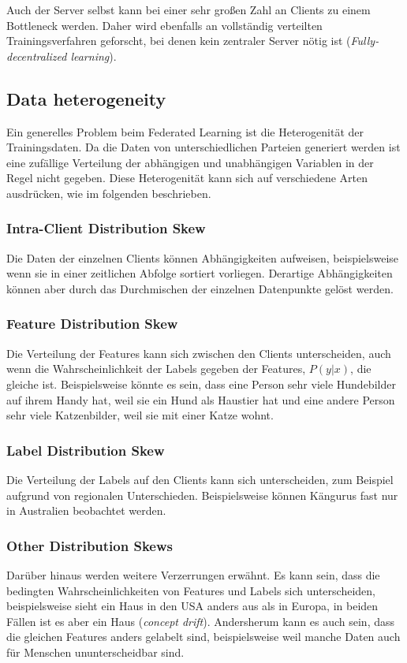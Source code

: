 Auch der Server selbst kann bei einer sehr großen Zahl an Clients zu einem Bottleneck werden.\cite[p.11]{kairouz:2021} Daher wird ebenfalls an vollständig verteilten Trainingsverfahren geforscht, bei denen kein zentraler Server nötig ist (\textit{Fully-decentralized learning}).

\subsection{Data heterogeneity}

Ein generelles Problem beim Federated Learning ist die Heterogenität der Trainingsdaten. Da die Daten von unterschiedlichen Parteien generiert werden ist eine zufällige Verteilung der abhängigen und unabhängigen Variablen in der Regel nicht gegeben. Diese Heterogenität kann sich auf verschiedene Arten ausdrücken, wie im folgenden beschrieben.

\subsubsection{Intra-Client Distribution Skew}
Die Daten der einzelnen Clients können Abhängigkeiten aufweisen, beispielsweise wenn sie in einer zeitlichen Abfolge sortiert vorliegen. Derartige Abhängigkeiten können aber durch das Durchmischen der einzelnen Datenpunkte gelöst werden.

\subsubsection{Feature Distribution Skew}
Die Verteilung der Features kann sich zwischen den Clients unterscheiden, auch wenn die Wahrscheinlichkeit der Labels gegeben der Features, $P(y|x)$, die gleiche ist. Beispielsweise könnte es sein, dass eine Person sehr viele Hundebilder auf ihrem Handy hat, weil sie ein Hund als Haustier hat und eine andere Person sehr viele Katzenbilder, weil sie mit einer Katze wohnt.

\subsubsection{Label Distribution Skew}
Die Verteilung der Labels auf den Clients kann sich unterscheiden, zum Beispiel aufgrund von regionalen Unterschieden. Beispielsweise können Kängurus fast nur in Australien beobachtet werden.

\subsubsection{Other Distribution Skews}
Darüber hinaus werden weitere Verzerrungen erwähnt. Es kann sein, dass die bedingten Wahrscheinlichkeiten von Features und Labels sich unterscheiden, beispielsweise sieht ein Haus in den USA anders aus als in Europa, in beiden Fällen ist es aber ein Haus (\textit{concept drift}). Andersherum kann es auch sein, dass die gleichen Features anders gelabelt sind, beispielsweise weil manche Daten auch für Menschen ununterscheidbar sind.

